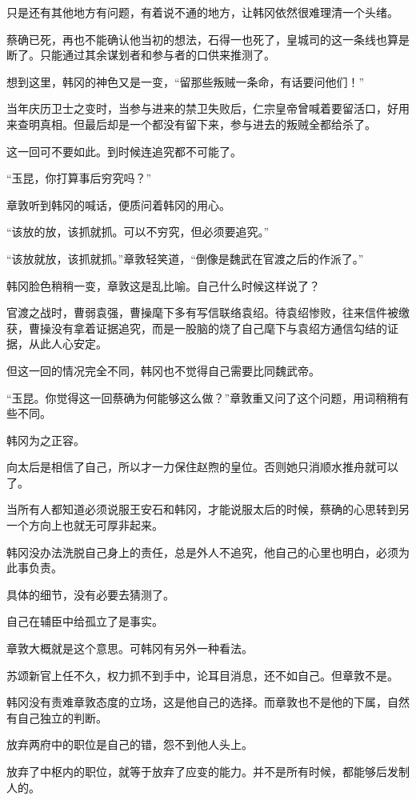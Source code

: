 只是还有其他地方有问题，有着说不通的地方，让韩冈依然很难理清一个头绪。

蔡确已死，再也不能确认他当初的想法，石得一也死了，皇城司的这一条线也算是断了。只能通过其余谋划者和参与者的口供来推测了。

想到这里，韩冈的神色又是一变，“留那些叛贼一条命，有话要问他们！”

当年庆历卫士之变时，当参与进来的禁卫失败后，仁宗皇帝曾喊着要留活口，好用来查明真相。但最后却是一个都没有留下来，参与进去的叛贼全都给杀了。

这一回可不要如此。到时候连追究都不可能了。

“玉昆，你打算事后穷究吗？”

章敦听到韩冈的喊话，便质问着韩冈的用心。

“该放的放，该抓就抓。可以不穷究，但必须要追究。”

“该放就放，该抓就抓。”章敦轻笑道，“倒像是魏武在官渡之后的作派了。”

韩冈脸色稍稍一变，章敦这是乱比喻。自己什么时候这样说了？

官渡之战时，曹弱袁强，曹操麾下多有写信联络袁绍。待袁绍惨败，往来信件被缴获，曹操没有拿着证据追究，而是一股脑的烧了自己麾下与袁绍方通信勾结的证据，从此人心安定。

但这一回的情况完全不同，韩冈也不觉得自己需要比同魏武帝。

“玉昆。你觉得这一回蔡确为何能够这么做？”章敦重又问了这个问题，用词稍稍有些不同。

韩冈为之正容。

向太后是相信了自己，所以才一力保住赵煦的皇位。否则她只消顺水推舟就可以了。

当所有人都知道必须说服王安石和韩冈，才能说服太后的时候，蔡确的心思转到另一个方向上也就无可厚非起来。

韩冈没办法洗脱自己身上的责任，总是外人不追究，他自己的心里也明白，必须为此事负责。

具体的细节，没有必要去猜测了。

自己在辅臣中给孤立了是事实。

章敦大概就是这个意思。可韩冈有另外一种看法。

苏颂新官上任不久，权力抓不到手中，论耳目消息，还不如自己。但章敦不是。

韩冈没有责难章敦态度的立场，这是他自己的选择。而章敦也不是他的下属，自然有自己独立的判断。

放弃两府中的职位是自己的错，怨不到他人头上。

放弃了中枢内的职位，就等于放弃了应变的能力。并不是所有时候，都能够后发制人的。

